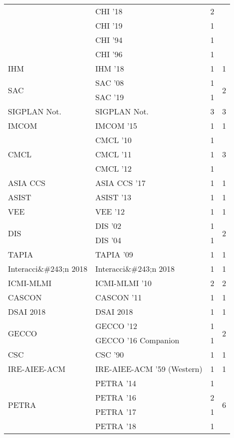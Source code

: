 \begin{table*}[t]
\begin{tabular}{llrr}
& CHI '18 & 2 &\\
& CHI '19 & 1 &\\
& CHI '94 & 1 &\\
& CHI '96 & 1 &\\
\multirow{1}{*}{IHM } & IHM '18 & 1 & \multirow{1}{*}{1}\\
\multirow{2}{*}{SAC } & SAC '08 & 1 & \multirow{2}{*}{2}\\
& SAC '19 & 1 &\\
\multirow{1}{*}{SIGPLAN Not.} & SIGPLAN Not. & 3 & \multirow{1}{*}{3}\\
\multirow{1}{*}{IMCOM } & IMCOM '15 & 1 & \multirow{1}{*}{1}\\
\multirow{3}{*}{CMCL } & CMCL '10 & 1 & \multirow{3}{*}{3}\\
& CMCL '11 & 1 &\\
& CMCL '12 & 1 &\\
\multirow{1}{*}{ASIA CCS } & ASIA CCS '17 & 1 & \multirow{1}{*}{1}\\
\multirow{1}{*}{ASIST } & ASIST '13 & 1 & \multirow{1}{*}{1}\\
\multirow{1}{*}{VEE } & VEE '12 & 1 & \multirow{1}{*}{1}\\
\multirow{2}{*}{DIS } & DIS '02 & 1 & \multirow{2}{*}{2}\\
& DIS '04 & 1 &\\
\multirow{1}{*}{TAPIA } & TAPIA '09 & 1 & \multirow{1}{*}{1}\\
\multirow{1}{*}{Interacci\&\#243;n 2018} & Interacci\&\#243;n 2018 & 1 & \multirow{1}{*}{1}\\
\multirow{1}{*}{ICMI-MLMI } & ICMI-MLMI '10 & 2 & \multirow{1}{*}{2}\\
\multirow{1}{*}{CASCON } & CASCON '11 & 1 & \multirow{1}{*}{1}\\
\multirow{1}{*}{DSAI 2018} & DSAI 2018 & 1 & \multirow{1}{*}{1}\\
\multirow{2}{*}{GECCO } & GECCO '12 & 1 & \multirow{2}{*}{2}\\
& GECCO '16 Companion & 1 &\\
\multirow{1}{*}{CSC } & CSC '90 & 1 & \multirow{1}{*}{1}\\
\multirow{1}{*}{IRE-AIEE-ACM } & IRE-AIEE-ACM '59 (Western) & 1 & \multirow{1}{*}{1}\\
\multirow{5}{*}{PETRA } & PETRA '14 & 1 & \multirow{5}{*}{6}\\
& PETRA '16 & 2 &\\
& PETRA '17 & 1 &\\
& PETRA '18 & 1 &\\

\end{tabular}
\end{table*}
